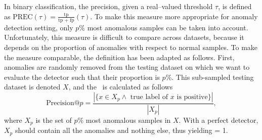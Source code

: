 \subsection{\preca} \label{preca}
In binary classification, the precision, given a real--valued threshold $\tau$, is defined as $\text{PREC}(\tau)=\frac{\text{tp}}{\text{tp + fp}}(\tau)$. To make this measure more appropriate for anomaly detection setting, only $p\%$ most anomalous samples can be taken into account. Unfortunately, this measure is difficult to compare across datasets, because it depends on the proportion of anomalies with respect to normal samples. To make the measure comparable, the definition has been adapted as follows. First, anomalies are randomly removed from the testing dataset on which we want to evaluate the detector such that their proportion is $p$\%. This sub-sampled testing dataset is denoted $X$, and the \preca~is calculated as follows
\begin{equation}
  \text{Precision@}p = \frac{|\lbrace x \in X_p \land \text{ true label of } x \text{ is positive}  \rbrace|}{|X_p|},
\end{equation}
where $X_p$ is the set of $p\%$ most anomalous samples in $X$. With a perfect detector, $X_p$ should contain all the anomalies and nothing else, thus yielding \preca = 1.

